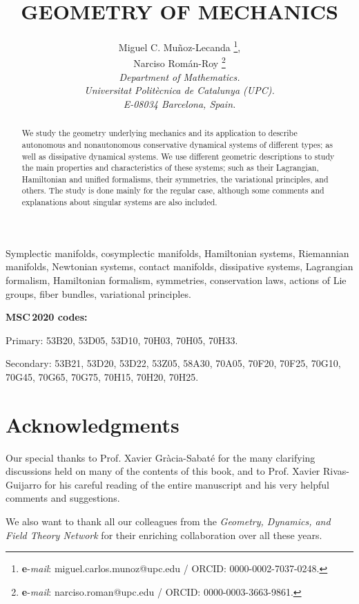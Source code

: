 \documentclass[12pt]{report}
\title{GEOMETRY OF MECHANICS}
\author{\sc Miguel C. Mu\~noz-Lecanda
\thanks{{\bf e}-{\it mail}: miguel.carlos.munoz@upc.edu /
ORCID: 0000-0002-7037-0248.},
   \\
\sc Narciso Rom\'an-Roy
\thanks{{\bf e}-{\it mail}: narciso.roman@upc.edu / 
ORCID: 0000-0003-3663-9861.}
   \\
  {\it Department of Mathematics.}\\
{\it Universitat Polit\`ecnica de Catalunya (UPC).}\\
{\it  E-08034 Barcelona, Spain.}}
\begin{document}

\maketitle

\begin{abstract}
We study
the geometry underlying mechanics and its application
to describe autonomous and nonautonomous conservative dynamical systems of different types; as well as dissipative dynamical systems.
We use different geometric descriptions to study
the main properties and characteristics of these systems;
such as their Lagrangian, Hamiltonian and unified formalisms, 
their symmetries, the variational principles, and others.
The study is done mainly for the regular case,
although some comments and explanations about singular systems are also included.
\end{abstract}

\bigskip


\noindent
Symplectic manifolds, cosymplectic manifolds, Hamiltonian systems,  Riemannian manifolds, Newtonian systems, contact manifolds, dissipative systems, Lagrangian formalism, Hamiltonian formalism, symmetries, conservation laws,  actions of Lie groups, fiber bundles, variational principles.

\medskip\medskip\medskip\medskip

\noindent\textbf{MSC\,2020 codes:}

\noindent Primary: 53B20, 53D05, 53D10, 70H03, 70H05, 70H33.

\noindent Secondary: 53B21, 53D20, 53D22, 53Z05, 58A30, 70A05, 70F20, 70F25, 70G10, 70G45, 70G65, 70G75, 70H15, 70H20, 70H25.


\setcounter{tocdepth}{2}


\newpage

\section*{Acknowledgments}


Our special thanks to Prof. Xavier Gr\`acia-Sabat\'e for the many clarifying discussions held on many of the contents of this book,
and to Prof. Xavier Rivas-Guijarro for his careful reading of the entire manuscript and his very helpful comments and suggestions.

We also want to thank all our colleagues from the 
{\sl Geometry, Dynamics, and Field Theory Network} for their enriching collaboration over all these years.
\end{document}
